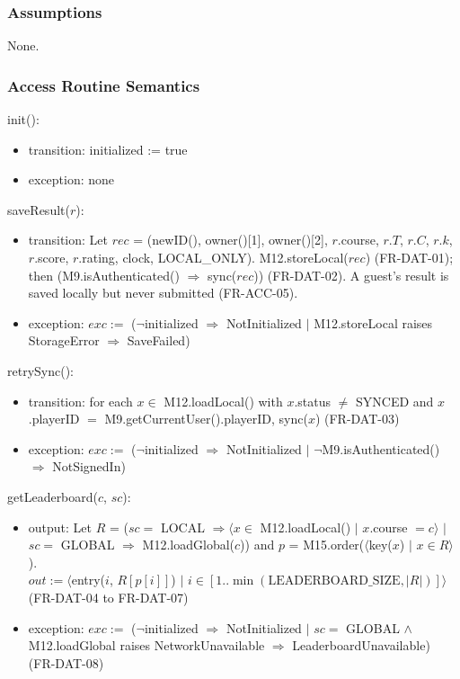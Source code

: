 \documentclass[12pt, titlepage]{article}
\newcommand{\True}{\textnormal{true}}
\newcommand{\noinit}{$\neg$initialized $\Rightarrow$ NotInitialized}
\begin{document}
\subsubsection{Assumptions}

None.

\subsubsection{Access Routine Semantics}

\noindent init():
\begin{itemize}
\item transition: initialized := \True
\item exception: none
\end{itemize}

\noindent saveResult($r$):
\begin{itemize}
\item transition: Let $rec$ = (newID(), owner()[1], owner()[2], $r$.course,
  $r.T$, $r.C$, $r.k$, $r$.score, $r$.rating, clock, LOCAL\_ONLY).
  M12.storeLocal($rec$) (FR-DAT-01); then (M9.isAuthenticated() $\Rightarrow$
  sync($rec$)) (FR-DAT-02). A guest's result is saved locally but never
  submitted (FR-ACC-05).
\item exception: $exc :=$ (\noinit{} $|$ M12.storeLocal raises StorageError
  $\Rightarrow$ SaveFailed)
\end{itemize}

\noindent retrySync():
\begin{itemize}
\item transition: for each $x \in$ M12.loadLocal() with $x$.status $\neq$
  SYNCED and $x$.playerID $=$ M9.getCurrentUser().playerID, sync($x$)
  (FR-DAT-03)
\item exception: $exc :=$ (\noinit{} $|$ $\neg$M9.isAuthenticated()
  $\Rightarrow$ NotSignedIn)
\end{itemize}

\noindent getLeaderboard($c$, $sc$):
\begin{itemize}
\item output: Let $R$ = ($sc =$ LOCAL $\Rightarrow \langle x \in$
  M12.loadLocal() $|$ $x$.course $= c\rangle$ $|$ $sc =$ GLOBAL
  $\Rightarrow$ M12.loadGlobal($c$)) and $p$ = M15.order($\langle$key($x$)
  $|$ $x \in R\rangle$). \\
  $out := \langle$entry($i$, $R[p[i]]$) $|$ $i \in
  [1..\min(\text{LEADERBOARD\_SIZE}, |R|)]\rangle$
  (FR-DAT-04 to FR-DAT-07)
\item exception: $exc :=$ (\noinit{} $|$ $sc =$ GLOBAL $\wedge$
  M12.loadGlobal raises NetworkUnavailable $\Rightarrow$
  LeaderboardUnavailable) (FR-DAT-08)
\end{itemize}
\end{document}
